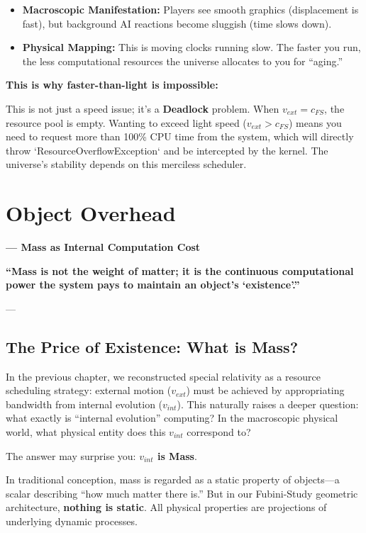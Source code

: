 \documentclass[11pt,a4paper,twoside]{book}
\begin{document}
\begin{itemize}
\item \textbf{Macroscopic Manifestation:} Players see smooth graphics (displacement is fast), but background AI reactions become sluggish (time slows down).

\item \textbf{Physical Mapping:} This is moving clocks running slow. The faster you run, the less computational resources the universe allocates to you for ``aging.''
\end{itemize}

\textbf{This is why faster-than-light is impossible:}

This is not just a speed issue; it's a \textbf{Deadlock} problem. When \textbf{$v_{ext} = c_{FS}$}, the resource pool is empty. Wanting to exceed light speed (\textbf{$v_{ext} > c_{FS}$}) means you need to request more than 100\% CPU time from the system, which will directly throw `ResourceOverflowException` and be intercepted by the kernel. The universe's stability depends on this merciless scheduler.

 \section{Object Overhead}

\textbf{--- Mass as Internal Computation Cost}

\textbf{``Mass is not the weight of matter; it is the continuous computational power the system pays to maintain an object's `existence'.''}

---

\subsection{The Price of Existence: What is Mass?}

In the previous chapter, we reconstructed special relativity as a resource scheduling strategy: external motion (\textbf{$v_{ext}$}) must be achieved by appropriating bandwidth from internal evolution (\textbf{$v_{int}$}). This naturally raises a deeper question: what exactly is ``internal evolution'' computing? In the macroscopic physical world, what physical entity does this \textbf{$v_{int}$} correspond to?

The answer may surprise you: \textbf{$v_{int}$ is Mass}.

In traditional conception, mass is regarded as a static property of objects---a scalar describing ``how much matter there is.'' But in our Fubini-Study geometric architecture, \textbf{nothing is static}. All physical properties are projections of underlying dynamic processes.
\end{document}
